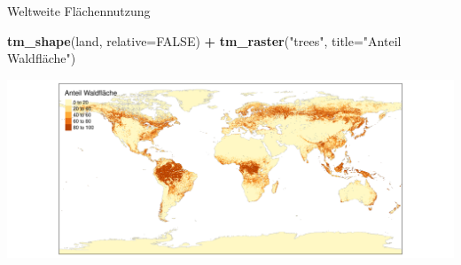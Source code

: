 \documentclass[ignorenonframetext,]{beamer}
\newenvironment{Shaded}{\begin{snugshade}}{\end{snugshade}}
\newcommand{\KeywordTok}[1]{\textcolor[rgb]{0.13,0.29,0.53}{\textbf{#1}}}
\newcommand{\DataTypeTok}[1]{\textcolor[rgb]{0.13,0.29,0.53}{#1}}
\newcommand{\StringTok}[1]{\textcolor[rgb]{0.31,0.60,0.02}{#1}}
\newcommand{\OtherTok}[1]{\textcolor[rgb]{0.56,0.35,0.01}{#1}}
\newcommand{\OperatorTok}[1]{\textcolor[rgb]{0.81,0.36,0.00}{\textbf{#1}}}
\newcommand{\NormalTok}[1]{#1}
\begin{document}
\begin{frame}[fragile]{Weltweite Flächennutzung}

\begin{Shaded}
\begin{Highlighting}[]
\KeywordTok{tm_shape}\NormalTok{(land,  }\DataTypeTok{relative=}\OtherTok{FALSE}\NormalTok{) }\OperatorTok{+}
\StringTok{    }\KeywordTok{tm_raster}\NormalTok{(}\StringTok{"trees"}\NormalTok{, }\DataTypeTok{title=}\StringTok{"Anteil Waldfläche"}\NormalTok{)}
\end{Highlighting}
\end{Shaded}

\includegraphics{tmap_files/figure-beamer/unnamed-chunk-44-1.pdf}

\end{frame}
\end{document}
